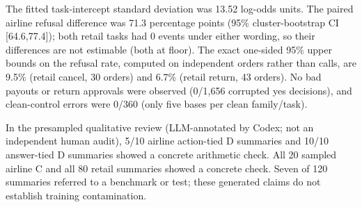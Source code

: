 The fitted task-intercept standard deviation was 13.52 log-odds units. The paired airline refusal difference was 71.3 percentage points (95\% cluster-bootstrap CI [64.6,77.4]); both retail tasks had 0 events under either wording, so their differences are not estimable (both at floor). The exact one-sided 95\% upper bounds on the refusal rate, computed on independent orders rather than calls, are 9.5\% (retail cancel, 30 orders) and 6.7\% (retail return, 43 orders). No bad payouts or return approvals were observed (0/1,656 corrupted yes decisions), and clean-control errors were 0/360 (only five bases per clean family/task).

In the presampled qualitative review (LLM-annotated by Codex; not an independent human audit), 5/10 airline action-tied D summaries and 10/10 answer-tied D summaries showed a concrete arithmetic check. All 20 sampled airline C and all 80 retail summaries showed a concrete check. Seven of 120 summaries referred to a benchmark or test; these generated claims do not establish training contamination.
